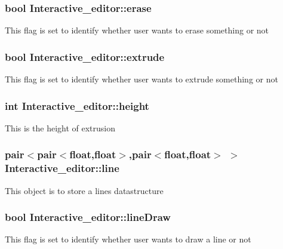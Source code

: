 \subsubsection[{\texorpdfstring{erase}{erase}}]{\setlength{\rightskip}{0pt plus 5cm}bool Interactive\+\_\+editor\+::erase}\hypertarget{classInteractive__editor_ac2f2f1dfb6c21585d4ed5ed043e41b25}{}\label{classInteractive__editor_ac2f2f1dfb6c21585d4ed5ed043e41b25}
This flag is set to identify whether user wants to erase something or not 
\subsubsection[{\texorpdfstring{extrude}{extrude}}]{\setlength{\rightskip}{0pt plus 5cm}bool Interactive\+\_\+editor\+::extrude}\hypertarget{classInteractive__editor_a3e4db48e715e92969ba3ec52ab14ce8d}{}\label{classInteractive__editor_a3e4db48e715e92969ba3ec52ab14ce8d}
This flag is set to identify whether user wants to extrude something or not 
\subsubsection[{\texorpdfstring{height}{height}}]{\setlength{\rightskip}{0pt plus 5cm}int Interactive\+\_\+editor\+::height}\hypertarget{classInteractive__editor_aced5ec777fe62fb280f3668a1c59f9b7}{}\label{classInteractive__editor_aced5ec777fe62fb280f3668a1c59f9b7}
This is the height of extrusion 
\subsubsection[{\texorpdfstring{line}{line}}]{\setlength{\rightskip}{0pt plus 5cm}pair$<$pair$<$float,float$>$,pair$<$float,float$>$ $>$ Interactive\+\_\+editor\+::line}\hypertarget{classInteractive__editor_ab12d018a266f71e228845e7ae5bd2181}{}\label{classInteractive__editor_ab12d018a266f71e228845e7ae5bd2181}
This object is to store a line\textquotesingle{}s datastructure 
\subsubsection[{\texorpdfstring{line\+Draw}{lineDraw}}]{\setlength{\rightskip}{0pt plus 5cm}bool Interactive\+\_\+editor\+::line\+Draw}\hypertarget{classInteractive__editor_aa0de8abac09ce2259252fba6c1958e83}{}\label{classInteractive__editor_aa0de8abac09ce2259252fba6c1958e83}
This flag is set to identify whether user wants to draw a line or not 
